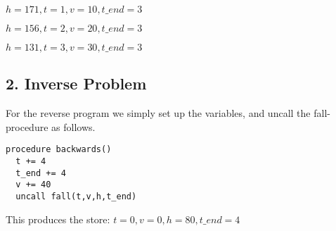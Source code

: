 \documentclass[12pt]{report}
\begin{document}
      $h = 171, t = 1, v = 10, t\_end = 3$

      $h = 156, t = 2, v = 20, t\_end = 3$

      $h = 131, t = 3, v = 30, t\_end = 3$

  \subsection*{2. Inverse Problem}
    For the reverse program we simply set up the variables, and uncall the fall-procedure as follows.
    \begin{verbatim}
procedure backwards()
  t += 4
  t_end += 4
  v += 40
  uncall fall(t,v,h,t_end)
    \end{verbatim}
    This produces the store:
    $t=0, v=0, h=80,t\_end=4$
\end{document}
